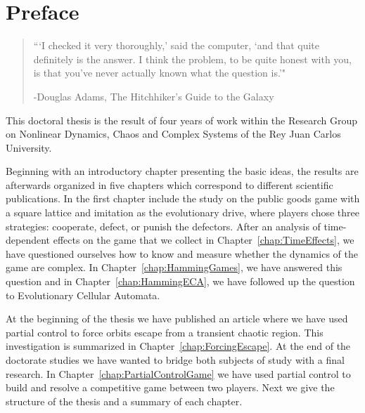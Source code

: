 \chapter*{Preface}


\begin{quotation}

\begin{flushright}
\begin{minipage}[t][5cm][b]{0.5\textwidth}
{ ```I checked it very thoroughly,' said the computer, `and that quite definitely is the answer. I think the
problem, to be quite honest with you, is that you've never actually known what the question is.'"}

\bigskip

-{\small  Douglas Adams, The Hitchhiker’s Guide to the Galaxy}
\end{minipage}
\end{flushright}

\vspace{0.5cm}
\end{quotation}


This doctoral thesis is the result of four years of work within the Research Group on Nonlinear Dynamics, Chaos and Complex Systems of the Rey Juan Carlos University.

Beginning with an introductory chapter presenting the basic ideas, the results are afterwards organized in five chapters which correspond to different scientific publications. In the first chapter include the study on the public goods game with a square lattice and imitation as the evolutionary drive, where players chose three strategies: cooperate, defect, or punish the defectors. After an analysis of time-dependent effects on the game that we collect in Chapter~\ref{chap:TimeEffects}, we have questioned ourselves how to know and measure whether the dynamics of the game are complex. In Chapter~\ref{chap:HammingGames}, we have answered this question and in Chapter~\ref{chap:HammingECA}, we have followed up the question to Evolutionary Cellular Automata. 

At the beginning of the thesis we have published an article where we have used partial control to force orbits escape from a transient chaotic region. This investigation is summarized in Chapter~\ref{chap:ForcingEscape}. At the end of the doctorate studies we have wanted to bridge both subjects of study with a final research. In Chapter~\ref{chap:PartialControlGame} we have used partial control to build and resolve a competitive game between two players. Next we give the structure of the thesis and a summary of each chapter.



